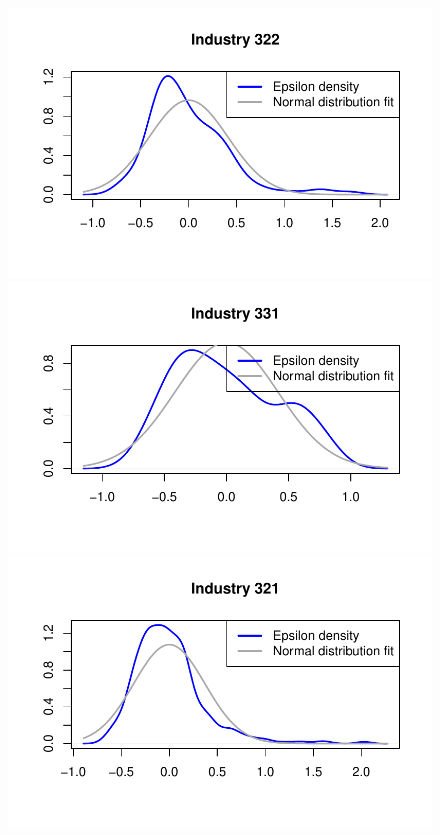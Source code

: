 \documentclass[
  12pt]{article}
\theoremstyle{definition}
\theoremstyle{remark}
\begin{document}
\begin{figure}

\begin{minipage}{\linewidth}

\includegraphics{Tax-Prod_files/figure-pdf/unnamed-chunk-12-1.pdf}

\includegraphics{Tax-Prod_files/figure-pdf/unnamed-chunk-12-2.pdf}

\includegraphics{Tax-Prod_files/figure-pdf/unnamed-chunk-12-3.pdf}


\end{minipage}
\end{figure}
\end{document}
